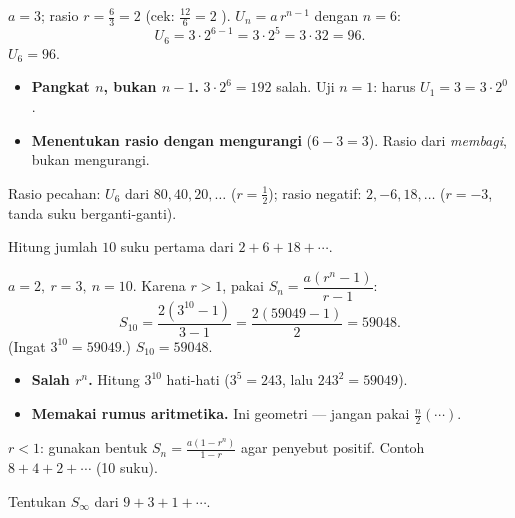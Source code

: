 \jawab
{} $a=3$; rasio $r=\frac{6}{3}=2$ (cek: $\frac{12}{6}=2$ \checkmark).
 $U_n=a\,r^{n-1}$ dengan $n=6$:
\[
U_6=3\cdot2^{6-1}=3\cdot2^5=3\cdot32=96.
\]
\jadi $U_6=96$.

\begin{jebakan}
\begin{itemize}[leftmargin=*,topsep=2pt]
  \item \textbf{Pangkat $n$, bukan $n-1$.} $3\cdot2^6=192$ salah. Uji $n=1$:
  harus $U_1=3=3\cdot2^0$ \checkmark.
  \item \textbf{Menentukan rasio dengan mengurangi} ($6-3=3$). Rasio dari
  \emph{membagi}, bukan mengurangi.
\end{itemize}
\end{jebakan}

\begin{variasi}
Rasio pecahan: $U_6$ dari $80,40,20,\dots$ ($r=\frac12$); rasio negatif:
$2,-6,18,\dots$ ($r=-3$, tanda suku berganti-ganti).
\end{variasi}

\begin{soalbox}{}
Hitung jumlah $10$ suku pertama dari $2+6+18+\cdots$.
\end{soalbox}

\jawab
{} $a=2,\ r=3,\ n=10$.
 Karena $r>1$, pakai $S_n=\dfrac{a(r^n-1)}{r-1}$:
\[
S_{10}=\frac{2(3^{10}-1)}{3-1}=\frac{2(59049-1)}{2}=59048.
\]
(Ingat $3^{10}=59049$.)
\jadi $S_{10}=59048$.

\begin{jebakan}
\begin{itemize}[leftmargin=*,topsep=2pt]
  \item \textbf{Salah $r^n$.} Hitung $3^{10}$ hati-hati ($3^5=243$, lalu
  $243^2=59049$).
  \item \textbf{Memakai rumus aritmetika.} Ini geometri --- jangan pakai
  $\frac n2(\cdots)$.
\end{itemize}
\end{jebakan}

\begin{variasi}
$r<1$: gunakan bentuk $S_n=\frac{a(1-r^n)}{1-r}$ agar penyebut positif.
Contoh $8+4+2+\cdots$ (10 suku).
\end{variasi}

\begin{soalbox}{}
Tentukan $S_\infty$ dari $9+3+1+\cdots$.
\end{soalbox}

